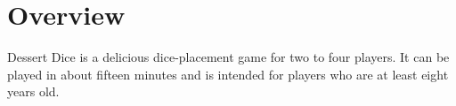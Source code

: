 \documentclass[a6paper, 11pt, parskip=half, DIV=15]{scrartcl}
\begin{document}
\begin{titlepage}

\enlargethispage{3.5\baselineskip}
\setmainfont[Scale=2.75]{LondrinaSolid}
\Huge
\phantom{a}
\end{titlepage}


\ClearShipoutPicture
\enlargethispage{1.75\baselineskip}
\section*{Overview}
Dessert Dice is a delicious dice-placement game for two to four players. It can be played in about fifteen minutes and is intended for players who are at least eight years old.
\end{document}
